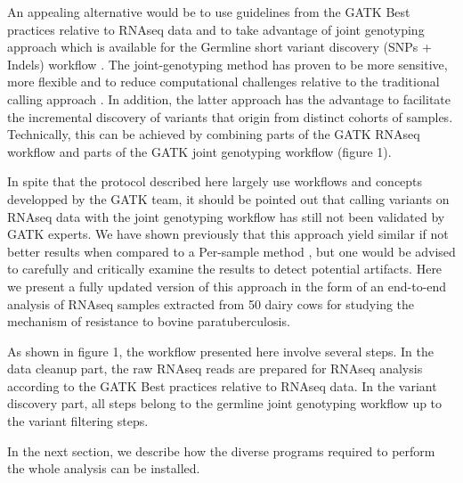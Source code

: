 \documentclass[]{article}
\begin{document}
An appealing alternative would be to use guidelines from the GATK Best practices relative to RNAseq data and to take advantage of joint genotyping approach which is available for the Germline short variant discovery (SNPs + Indels) workflow \cite{GATK_BP_Germline}. The joint-genotyping method has proven to be more sensitive, more flexible and to reduce computational challenges relative to the traditional calling approach \cite{GATK_jointCalling_1}. In addition, the latter approach has the advantage to facilitate the incremental discovery of variants that origin from distinct cohorts of samples. Technically, this can be achieved by combining parts of the GATK RNAseq workflow and parts of the GATK joint genotyping workflow (figure 1).

In spite that the protocol described here largely use workflows and concepts developped by the GATK team, it should be pointed out that calling variants on RNAseq data with the joint genotyping workflow has still not been validated by GATK experts. We have shown previously that this approach yield similar if not better results when compared to a Per-sample method \cite{Brouard2019}, but one would be advised to carefully and critically examine the results to detect potential artifacts. Here we present a fully updated version of this approach in the form of an end-to-end analysis of RNAseq samples extracted from 50 dairy cows for studying the mechanism of resistance to bovine paratuberculosis.



As shown in figure 1, the workflow presented here involve several steps. In the data cleanup part, the raw RNAseq reads are prepared for RNAseq analysis according to the GATK Best practices relative to RNAseq data. In the variant discovery part, all steps belong to the germline joint genotyping workflow up to the variant filtering steps.

In the next section, we describe how the diverse programs required to perform the whole analysis can be installed.





\end{document}
